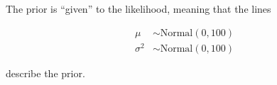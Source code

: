 The prior is ``given'' to the likelihood, meaning that the lines


\begin{align*}
    \mu &\sim \text{Normal}(0,100) \\
    \sigma^2 &\sim \text{Normal}(0,100)
\end{align*}

describe the prior.